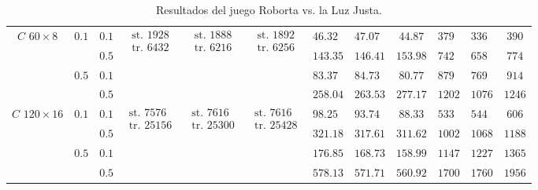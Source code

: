 \begin{table}[tp]
{\begin{tabular}{|c|c|c|c|c|c|g|h|c|g|h|c|}
       &  & $0.1$ &  &   &   & $46.32$ & $47.07$ & $44.87$ & $379$ & $336$ & $390$ \\ \hhline{|~|~|-|~|~|~|-|-|-|-|-|-|}
       & & $0.5$ & & & & $143.35$ & $146.41$ & $153.98$ & $742$ & $658$ & $774$ \\ \hhline{|~|-|-|~|~|~|-|-|-|-|-|-|}
       &  & $0.1$ & & & & $83.37$ & $84.73$ & $80.77$ & $879$ & $769$ & $914$ \\ \hhline{|~|~|-|~|~|~|-|-|-|-|-|-|}
       & & $0.5$ & & & & $258.04$ & $263.53$ & $277.17$ & $1202$ & $1076$ & $1246$ \\ \hline

       &  & $0.1$ &  &   &   & $98.25$ & $93.74$ & $88.33$ & $533$ & $544$ & $606$ \\ \hhline{|~|~|-|~|~|~|-|-|-|-|-|-|}
       & & $0.5$ & & & & $321.18$ & $317.61$ & $311.62$ & $1002$ & $1068$ & $1188$ \\ \hhline{|~|-|-|~|~|~|-|-|-|-|-|-|}
       &  & $0.1$ & & & & $176.85$ & $168.73$ & $158.99$ & $1147$ & $1227$ & $1365$\\ \hhline{|~|~|-|~|~|~|-|-|-|-|-|-|}
       & & $0.5$ & & & & $578.13$ & $571.71$ & $560.92$ & $1700$ & $1760$ & $1956$ \\ 

      \hline
    \end{tabular}
  }
  \caption{Resultados del juego Roborta vs. la Luz Justa.}
  \label{table:resultsRobot}
\end{table}


